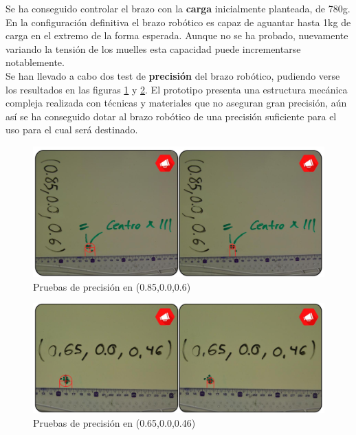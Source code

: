 	Se ha conseguido controlar el brazo con la \textbf{carga} inicialmente planteada, de 780g. En la configuración definitiva el brazo robótico es capaz de aguantar hasta 1kg de carga en el extremo de la forma esperada. Aunque no se ha probado, nuevamente variando la tensión de los muelles esta capacidad puede incrementarse notablemente.
	\\
	
	Se han llevado a cabo dos test de \textbf{precisión} del brazo robótico, pudiendo verse los resultados en las figuras \ref{fig:Resultados:prueba1} y \ref{fig:Resultados:prueba2}. El prototipo presenta una estructura mecánica compleja realizada con técnicas y materiales que no aseguran gran precisión, aún así se ha conseguido dotar al brazo robótico de una precisión suficiente para el uso para el cual será destinado. 
	\\
	
	\begin{figure}[t]
		\centering
		\includegraphics[width=1\textwidth]{figuras/Imagenes_Resultados/pruebas_1.jpg}
		\caption{Pruebas de precisión en (0.85,0.0,0.6)}
		\label{fig:Resultados:prueba1}
	\end{figure}
	
	\begin{figure}[t]
		\centering
		\includegraphics[width=1\textwidth]{figuras/Imagenes_Resultados/pruebas_2.jpg}
		\caption{Pruebas de precisión en (0.65,0.0,0.46)}
		\label{fig:Resultados:prueba2}
	\end{figure}
	
